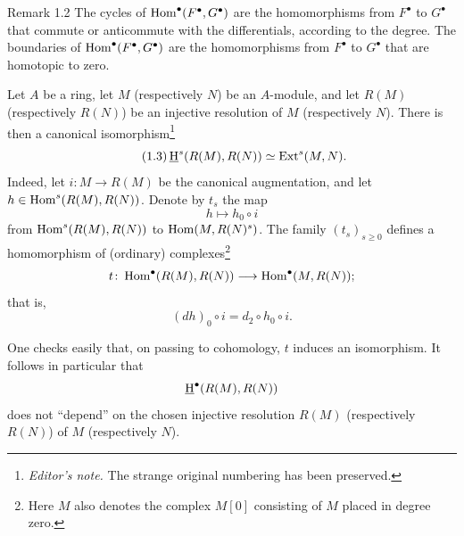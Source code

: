 \begin{sgaremark}{Remark 1.2}
The cycles of $\operatorname{Hom}^{\bullet}(F^{\bullet},G^{\bullet})$ are the
homomorphisms from $F^{\bullet}$ to $G^{\bullet}$ that commute or
anticommute with the differentials, according to the degree. The boundaries
of $\operatorname{Hom}^{\bullet}(F^{\bullet},G^{\bullet})$ are the homomorphisms from
$F^{\bullet}$ to $G^{\bullet}$ that are homotopic to zero.
\end{sgaremark}

\newpage
Let $A$ be a ring, let $M$ (respectively $N$) be an $A$-module, and let
$R(M)$ (respectively $R(N)$) be an injective resolution of $M$ (respectively
$N$). There is then a canonical isomorphism\footnote{\textit{Editor's
note.} The strange original numbering has been preserved.}
\begin{equation*}\tag{1.3}\label{eq:V.1.3}
  \mathop{\underline{\mathrm H}}\nolimits^s(R(M),R(N))\simeq\operatorname{Ext}^s(M,N).
\end{equation*}
Indeed, let $i\colon M\to R(M)$ be the canonical augmentation, and let
$h\in\operatorname{Hom}^s(R(M),R(N))$. Denote by $t_s$ the map
\[
  h\longmapsto h_0\circ i
\]
from $\operatorname{Hom}^s(R(M),R(N))$ to $\operatorname{Hom}(M,R(N)^s)$. The family
$(t_s)_{s\geq 0}$ defines a homomorphism of (ordinary) complexes\footnote{Here
$M$ also denotes the complex $M[0]$ consisting of $M$ placed in degree zero.}
\[
  t\colon \operatorname{Hom}^{\bullet}(R(M),R(N))
    \longrightarrow \operatorname{Hom}^{\bullet}(M,R(N));
\]
that is,
\[
  (dh)_0\circ i=d_2\circ h_0\circ i.
\]

One checks easily that, on passing to cohomology, $t$ induces an isomorphism.
It follows in particular that
\[
  \mathop{\underline{\mathrm H}}\nolimits^{\bullet}(R(M),R(N))
\]
does not ``depend'' on the chosen injective resolution $R(M)$ (respectively
$R(N)$) of $M$ (respectively $N$).

